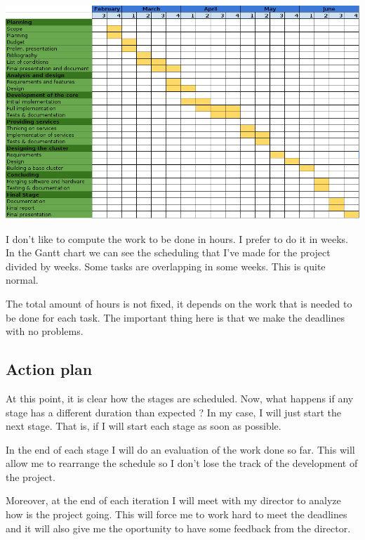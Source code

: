 \begin{center}
  \hspace*{-2cm}
  \includegraphics[scale=0.75]{images/gantt.png}
\end{center}

I don't like to compute the work to be done in hours. I prefer to do it in
weeks. In the Gantt chart we can see the scheduling that I've made for the
project divided by weeks. Some tasks are overlapping in some weeks. This is
quite normal.

The total amount of hours is not fixed, it depends on the work that is needed
to be done for each task. The important thing here is that we make the
deadlines with no problems.

\subsection{Action plan}

At this point, it is clear how the stages are scheduled. Now, what happens if
any stage has a different duration than expected ? In my case, I will just
start the next stage. That is, if I will start each stage as soon as possible.

In the end of each stage I will do an evaluation of the work done so far. This
will allow me to rearrange the schedule so I don't lose the track of the
development of the project.

Moreover, at the end of each iteration I will meet with my director to analyze
how is the project going. This will force me to work hard to meet the deadlines
and it will also give me the oportunity to have some feedback from the director.
